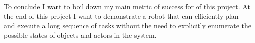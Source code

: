 \documentclass[letterpaper, 10 pt, conference]{ieeeconf}  %
\begin{document}
To conclude I want to boil down my main metric of success for of this project. At the end of this project I want to demonstrate a robot that can efficiently plan and execute a long sequence of tasks without the need to explicitly enumerate the possible states of objects and actors in the system.



\addtolength{\textheight}{-12cm}   %





\end{document}
